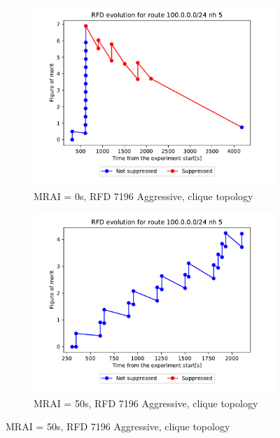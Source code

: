 \begin{figure}[h]
     \centering
     \begin{subfigure}[b]{0.3\textwidth}
         \centering
         \includegraphics[width=\textwidth]{images/RFD/clique/FigureOfMerit/mrai1_RFD_7196_aggressive_x_rfd_R1.pdf}
         \caption{MRAI = 0s, RFD 7196 Aggressive, clique topology}
         \label{fig:clique_x_mrai0_rfd7196Aggressive}
     \end{subfigure}
     \hfill
     \begin{subfigure}[b]{0.3\textwidth}
         \centering
         \includegraphics[width=\textwidth]{images/RFD/clique/FigureOfMerit/mrai11_RFD_7196_aggressive_x_rfd_R1.pdf}
         \caption{MRAI = 50s, RFD 7196 Aggressive, clique topology}

\end{subfigure}
\end{figure}
